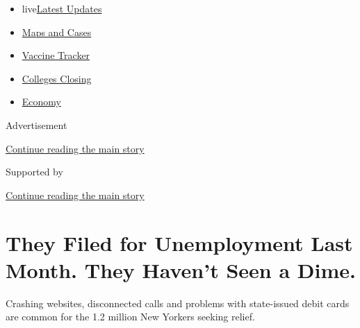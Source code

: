 \begin{itemize}
\tightlist
\item
  live\href{https://www.nytimes3xbfgragh.onion/2020/08/21/world/covid-19-coronavirus.html?name=styln-coronavirus-national\&region=TOP_BANNER\&variant=undefined\&block=storyline_menu_recirc\&action=click\&pgtype=Article\&impression_id=6d1a6810-e399-11ea-8ff5-fbf1b2be4040}{Latest
  Updates}
\item
  \href{https://www.nytimes3xbfgragh.onion/interactive/2020/us/coronavirus-us-cases.html?name=styln-coronavirus-national\&region=TOP_BANNER\&variant=undefined\&block=storyline_menu_recirc\&action=click\&pgtype=Article\&impression_id=6d1a6811-e399-11ea-8ff5-fbf1b2be4040}{Maps
  and Cases}
\item
  \href{https://www.nytimes3xbfgragh.onion/interactive/2020/science/coronavirus-vaccine-tracker.html?name=styln-coronavirus-national\&region=TOP_BANNER\&variant=undefined\&block=storyline_menu_recirc\&action=click\&pgtype=Article\&impression_id=6d1a6812-e399-11ea-8ff5-fbf1b2be4040}{Vaccine
  Tracker}
\item
  \href{https://www.nytimes3xbfgragh.onion/2020/08/19/us/colleges-closing-covid.html?name=styln-coronavirus-national\&region=TOP_BANNER\&variant=undefined\&block=storyline_menu_recirc\&action=click\&pgtype=Article\&impression_id=6d1a6813-e399-11ea-8ff5-fbf1b2be4040}{Colleges
  Closing}
\item
  \href{https://www.nytimes3xbfgragh.onion/live/2020/08/20/business/stock-market-today-coronavirus?name=styln-coronavirus-national\&region=TOP_BANNER\&variant=undefined\&block=storyline_menu_recirc\&action=click\&pgtype=Article\&impression_id=6d1a6814-e399-11ea-8ff5-fbf1b2be4040}{Economy}
\end{itemize}

Advertisement

\protect\hyperlink{after-top}{Continue reading the main story}

Supported by

\protect\hyperlink{after-sponsor}{Continue reading the main story}

\hypertarget{they-filed-for-unemployment-last-month-they-havent-seen-a-dime}{%
\section{They Filed for Unemployment Last Month. They Haven't Seen a
Dime.}\label{they-filed-for-unemployment-last-month-they-havent-seen-a-dime}}

Crashing websites, disconnected calls and problems with state-issued
debit cards are common for the 1.2 million New Yorkers seeking relief.

